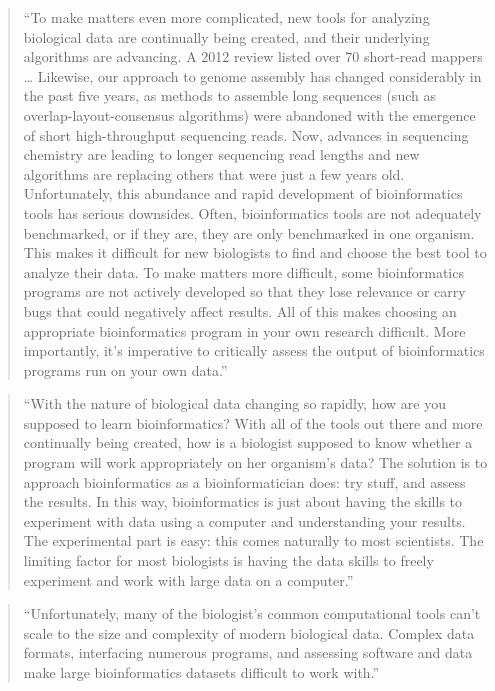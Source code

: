 \documentclass[]{tufte-book}
\begin{document}
\begin{quote}
``To make matters even more complicated, new tools for analyzing biological data are
continually being created, and their underlying algorithms are advancing. A 2012 review
listed over 70 short-read mappers \ldots{} Likewise, our approach to genome assembly has
changed considerably in the past five years, as methods to assemble long sequences
(such as overlap-layout-consensus algorithms) were abandoned with the emergence of
short high-throughput sequencing reads. Now, advances in sequencing chemistry are
leading to longer sequencing read lengths and new algorithms are replacing others that
were just a few years old. Unfortunately, this abundance and rapid development of
bioinformatics tools has serious downsides. Often, bioinformatics tools are not adequately
benchmarked, or if they are, they are only benchmarked in one organism. This makes it
difficult for new biologists to find and choose the best tool to analyze their data.
To make matters more difficult, some bioinformatics programs are not actively developed
so that they lose relevance or carry bugs that could negatively affect results. All of
this makes choosing an appropriate bioinformatics program in your own research difficult.
More importantly, it's imperative to critically assess the output of bioinformatics
programs run on your own data.'' \citep{buffalo2015bioinformatics}
\end{quote}

\begin{quote}
``With the nature of biological data changing so rapidly, how are you supposed to
learn bioinformatics? With all of the tools out there and more continually being
created, how is a biologist supposed to know whether a program will work appropriately
on her organism's data? The solution is to approach bioinformatics as a bioinformatician
does: try stuff, and assess the results. In this way, bioinformatics is just about having
the skills to experiment with data using a computer and understanding your results.
The experimental part is easy: this comes naturally to most scientists. The limiting
factor for most biologists is having the data skills to freely experiment and work with
large data on a computer.'' \citep{buffalo2015bioinformatics}
\end{quote}

\begin{quote}
``Unfortunately, many of the biologist's common computational tools can't scale to the
size and complexity of modern biological data. Complex data formats, interfacing
numerous programs, and assessing software and data make large bioinformatics datasets
difficult to work with.'' \citep{buffalo2015bioinformatics}
\end{quote}
\end{document}
